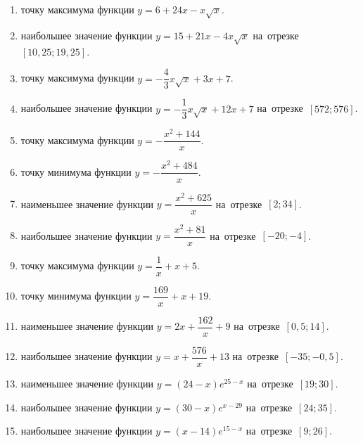 \documentclass[a4paper,10pt]{article}
\begin{document}
\begin{enumerate}
\item {} точку максимума функции $y=6+24x -x\sqrt{x}$.

\item {} наибольшее значение функции $y=15+21x -4x\sqrt{x}$ на~отрезке~$\left[10,25;19,25\right]$.

\item {} точку максимума функции $y=-\dfrac{4}{3}x\sqrt{x} +3x+7$.

\item {} наибольшее значение функции $y=-\dfrac{1}{3}x\sqrt{x} +12x+7$ на~отрезке~$\left[572;576\right]$.

\item {} точку максимума функции $y=-\dfrac{x^2 +144}{x}$.

\item {} точку минимума функции $y=-\dfrac{x^2 +484}{x}$.

\item {} наименьшее значение функции $y=\dfrac{x^2 +625}{x}$ на~отрезке~$\left[2;34\right]$.

\item {} наибольшее значение функции $y=\dfrac{x^2 +81}{x}$ на~отрезке~$\left[-20;-4\right]$.

\item {} точку максимума функции $y=\dfrac{1}{x} +x+5$.

\item {} точку минимума функции $y=\dfrac{169}{x} +x+19$.

\item {} наименьшее значение функции $y=2x+\dfrac{162}{x} +9$ на~отрезке~$\left[0,5;14\right]$.

\item {} наибольшее значение функции $y=x+\dfrac{576}{x} +13$ на~отрезке~$\left[-35;-0,5\right]$.

\item {} наименьшее значение функции $y=\left(24-x\right)e^{25-x}$ на~отрезке~$\left[19;30\right]$.

\item {} наибольшее значение функции $y=\left(30-x\right)e^{x-29}$ на~отрезке~$\left[24;35\right]$.

\item {} наибольшее значение функции $y=\left(x-14\right)e^{15-x}$ на~отрезке~$\left[9;26\right]$.


\end{enumerate}
\end{document}
